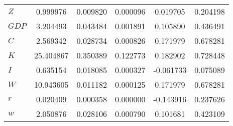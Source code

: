 \begin{center}
\begin{longtable}{lccccc}
$Z         $	 & 	        0.999976	 & 	        0.009820	 & 	        0.000096	 & 	        0.019705	 & 	        0.204198 \\ 
$GDP       $	 & 	        3.204493	 & 	        0.043484	 & 	        0.001891	 & 	        0.105890	 & 	        0.436491 \\ 
$C         $	 & 	        2.569342	 & 	        0.028734	 & 	        0.000826	 & 	        0.171979	 & 	        0.678281 \\ 
$K         $	 & 	       25.404867	 & 	        0.350389	 & 	        0.122773	 & 	        0.182902	 & 	        0.728448 \\ 
$I         $	 & 	        0.635154	 & 	        0.018085	 & 	        0.000327	 & 	       -0.061733	 & 	        0.075089 \\ 
$W         $	 & 	       10.943605	 & 	        0.011182	 & 	        0.000125	 & 	        0.171979	 & 	        0.678281 \\ 
$r         $	 & 	        0.020409	 & 	        0.000358	 & 	        0.000000	 & 	       -0.143916	 & 	        0.237626 \\ 
$w         $	 & 	        2.050876	 & 	        0.028106	 & 	        0.000790	 & 	        0.101681	 & 	        0.423109 \\ 
\end{longtable}
 \end{center}
